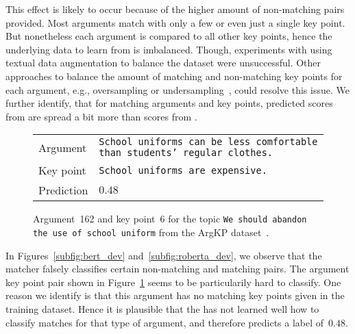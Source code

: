 This effect is likely to occur because of the higher amount of non-matching pairs provided.
Most arguments match with only a few or even just a single key point.
But nonetheless each argument is compared to all other key points, hence the underlying data to learn from is imbalanced. 
Though, experiments with using textual data augmentation to balance the dataset were unsuccessful.
Other approaches to balance the amount of matching and non-matching key points for each argument, e.g., oversampling or undersampling~\todocite, could resolve this issue.
We further identify, that for matching arguments and key points, predicted scores from \BertBase are spread a bit more than scores from \RobertaBase.

\begin{figure}
    \begin{tabularx}{\linewidth}{@{}lX@{}}
        Argument & \texttt{School uniforms can be less comfortable than students' regular clothes.} \\
        Key point & \texttt{School uniforms are expensive.} \\
        Prediction & \(0.48\) \\
    \end{tabularx}
    \caption{Argument~162 and key point~6 for the topic \texttt{We should abandon the use of school uniform} from the ArgKP dataset~\cite{Bar-HaimEFKLS2020}.}
    \label{example-4-162-6}
\end{figure}
In Figures~\ref{subfig:bert_dev} and~\ref{subfig:roberta_dev}, we observe that the \BertBase matcher falsely classifies certain non-matching and matching pairs. The argument key point pair shown in Figure~\ref{example-4-162-6} seems to be particularily hard to classify.
One reason we identify is that this argument has no matching key points given in the training dataset.
Hence it is plausible that the \BertBase has not learned well how to classify matches for that type of argument, and therefore predicts a label of~\(0.48\).

